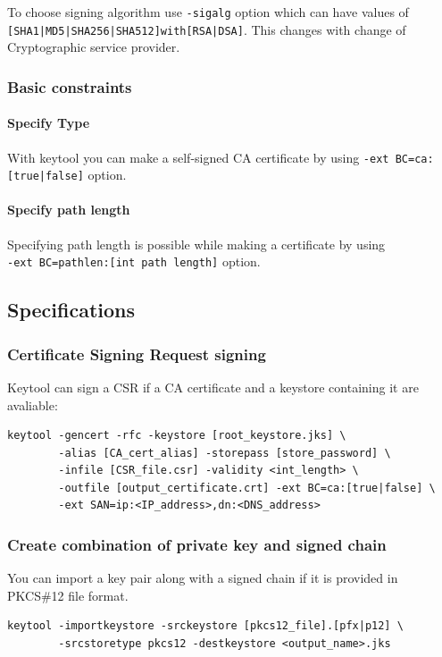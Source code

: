 \documentclass[10pt, a4paper]{report}
\begin{document}
To choose signing algorithm use \verb+-sigalg+ option which can have values of \verb+[SHA1|MD5|SHA256|SHA512]with[RSA|DSA]+. This changes with change of Cryptographic service provider.
    \subsubsection{Basic constraints}
    
      \paragraph{Specify Type}
With keytool you can make a self-signed CA certificate by using \verb+-ext BC=ca:[true|false]+ option.

      \paragraph{Specify path length}
Specifying path length is possible while making a certificate by using  \\
\verb+-ext BC=pathlen:[int path length]+ option.

  \subsection{Specifications}
  
    \subsubsection{Certificate Signing Request signing}
Keytool can sign a CSR if a CA certificate and a keystore containing it are avaliable:
\begin{verbatim}
keytool -gencert -rfc -keystore [root_keystore.jks] \
        -alias [CA_cert_alias] -storepass [store_password] \
        -infile [CSR_file.csr] -validity <int_length> \
        -outfile [output_certificate.crt] -ext BC=ca:[true|false] \
        -ext SAN=ip:<IP_address>,dn:<DNS_address> 
\end{verbatim}

    \subsubsection{Create combination of private key and signed chain}
You can import a key pair along with a signed chain if it is provided in PKCS\#12 file format.
\begin{verbatim}
keytool -importkeystore -srckeystore [pkcs12_file].[pfx|p12] \
        -srcstoretype pkcs12 -destkeystore <output_name>.jks
\end{verbatim}
\end{document}
